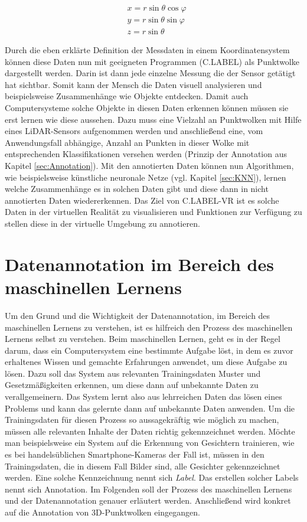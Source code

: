 \begin{subequations}
\begin{align}
        &x = r\sin\theta\cos\varphi \\
		&y = r\sin\theta\sin\varphi \\
		&z = r\sin\theta
\end{align}
\label{eq:SphToKart}
\end{subequations}

Durch die eben erklärte Definition der Messdaten in einem Koordinatensystem können diese Daten nun mit geeigneten Programmen (C.LABEL) als Punktwolke dargestellt werden. Darin ist dann jede einzelne Messung die der Sensor getätigt hat sichtbar. Somit kann der Mensch die Daten visuell analysieren und beispielsweise Zusammenhänge wie Objekte entdecken. Damit auch Computersysteme solche Objekte in diesen Daten erkennen können müssen sie erst lernen wie diese aussehen. Dazu muss eine Vielzahl an Punktwolken mit Hilfe eines LiDAR-Sensors aufgenommen werden und anschließend eine, vom Anwendungsfall abhängige, Anzahl an Punkten in dieser Wolke mit entsprechenden Klassifikationen versehen werden (Prinzip der Annotation aus Kapitel \ref{sec:Annotation}). Mit den annotierten Daten können nun Algorithmen, wie beispielsweise künstliche neuronale Netze (vgl. Kapitel \ref{sec:KNN}), lernen welche Zusammenhänge es in solchen Daten gibt und diese dann in nicht annotierten Daten wiedererkennen. Das Ziel von C.LABEL-VR ist es solche Daten in der virtuellen Realität zu visualisieren und Funktionen zur Verfügung zu stellen diese in der virtuelle Umgebung zu annotieren.

\section{Datenannotation im Bereich des maschinellen Lernens}
\label{sec:AnnotationIntro}

Um den Grund und die Wichtigkeit der Datenannotation, im Bereich des maschinellen Lernens zu verstehen, ist es hilfreich den Prozess des maschinellen Lernens selbst zu verstehen. Beim maschinellen Lernen, geht es in der Regel darum, dass ein Computersystem eine bestimmte Aufgabe löst, in dem es zuvor erhaltenes Wissen und gemachte Erfahrungen anwendet, um diese Aufgabe zu lösen. Dazu soll das System aus relevanten Trainingsdaten Muster und Gesetzmäßigkeiten erkennen, um diese dann auf unbekannte Daten zu verallgemeinern. Das System lernt also aus lehrreichen Daten das lösen eines Problems und kann das gelernte dann auf unbekannte Daten anwenden. Um die Trainingsdaten für diesen Prozess so aussagekräftig wie möglich zu machen, müssen alle relevanten Inhalte der Daten richtig gekennzeichnet werden. Möchte man beispielsweise ein System auf die Erkennung von Gesichtern trainieren, wie es bei handelsüblichen Smartphone-Kameras der Fall ist, müssen in den Trainingsdaten, die in diesem Fall Bilder sind, alle Gesichter gekennzeichnet werden. Eine solche Kennzeichnung nennt sich \textit{Label}. Das erstellen solcher Labels nennt sich Annotation. Im Folgenden soll der Prozess des maschinellen Lernens und der Datenannotation genauer erläutert werden. Anschließend wird konkret auf die Annotation von 3D-Punktwolken eingegangen.

